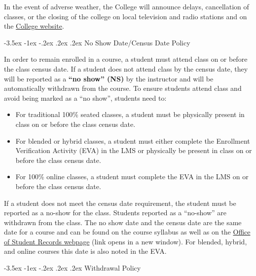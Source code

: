 \documentclass[11pt]{article}
\makeatletter
\renewcommand\section{\@startsection{section}{1}{0pt}%
  {-3.5ex \@plus -1ex \@minus -.2ex}%
  {.2ex \@plus.2ex}%
  {\normalfont\Large\bfseries}} %
\makeatother
\begin{document}
In the event of adverse weather, the College will announce delays, cancellation of classes, or the closing of the college on local television and radio stations and on the \href{https://www.mitchellcc.edu}{College website}.

\section{No Show Date/Census Date Policy}

In order to remain enrolled in a course, a student must attend class on or before the class census date. If a student does not attend class by the census date, they will be reported as a \textbf{``no show'' (NS)} by the instructor and will be automatically withdrawn from the course.  To ensure students attend class and avoid being marked as a ``no show'', students need to:

\begin{itemize}
\item For traditional 100\% seated classes, a student must be physically present in class on or before the class census date.


\item For blended or hybrid classes, a student must either complete the Enrollment Verification Activity (EVA) in the LMS or physically be present in class on or before the class census date.


\item For 100\% online classes, a student must complete the EVA in the LMS on or before the class census date.
\end{itemize}

If a student does not meet the census date requirement, the student must be reported as a no-show for the class. Students reported as a ``no-show'' are withdrawn from the class.  The no show date and the census date are the same date for a course and can be found on the course syllabus as well as on the \href{https://mitchellcc.edu/office-student-records}{Office of Student Records webpage} (link opens in a new window). For blended, hybrid, and online courses this date is also noted in the EVA.

\section{Withdrawal Policy}
\end{document}
